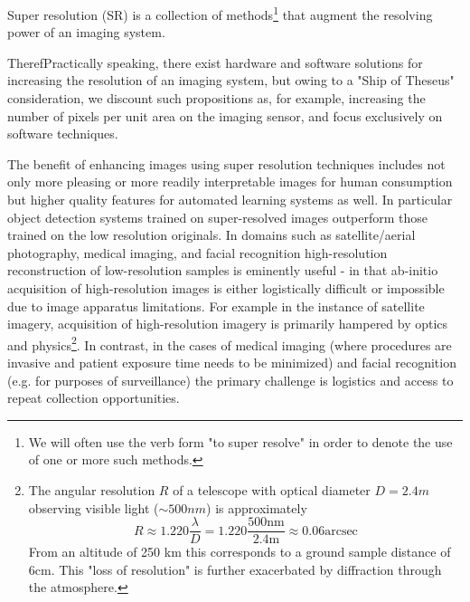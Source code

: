 \documentclass[journal]{IEEEtran}
\begin{document}
    Super resolution (SR) is a collection of methods\footnote{We will often use the verb form "to super resolve"
    in order to denote the use of one or more such methods.} that augment the resolving power of an imaging system.


    TherefPractically speaking, there exist hardware and software solutions for increasing the resolution of an imaging
    system, but owing to a "Ship of Theseus" consideration, we discount such propositions as, for example, increasing
    the number of pixels per unit area on the imaging sensor, and focus exclusively on software techniques.






    The benefit of enhancing images using super resolution techniques includes not only more pleasing or more readily interpretable images
    for human consumption but higher quality features for automated learning systems as well.
    In particular object detection systems trained on super-resolved images outperform those trained on the low
    resolution originals\cite{effectssuperres}. In domains such as satellite/aerial photography, medical imaging, and facial recognition
    high-resolution reconstruction of low-resolution samples is eminently useful - in that ab-initio acquisition of
    high-resolution images is either logistically difficult or impossible due to image apparatus limitations. For example in the
    instance of satellite imagery, acquisition of high-resolution imagery is primarily hampered by optics and
    physics\footnote{The angular resolution $R$ of a telescope with optical diameter $D = 2.4m$ observing visible light
    ($\sim500nm$) is approximately\cite{doi:10.1080.14786447908639684} \[R  \approx 1.220\frac{\lambda}{D} = 1.220 \frac{500\text{nm}}{2.4\text{m}} \approx 0.06 \text{arcsec}\]
    From an altitude of 250 km this corresponds to a ground sample distance of 6cm. This "loss of resolution" is further
    exacerbated by diffraction through the atmosphere.}. In contrast, in the cases of medical imaging
    (where procedures are invasive and patient exposure time needs to be minimized\cite{doi:10.1002.cmr.a.21249}) and
    facial recognition (e.g. for purposes of surveillance) the primary challenge is logistics and access to repeat collection
    opportunities.
\end{document}
